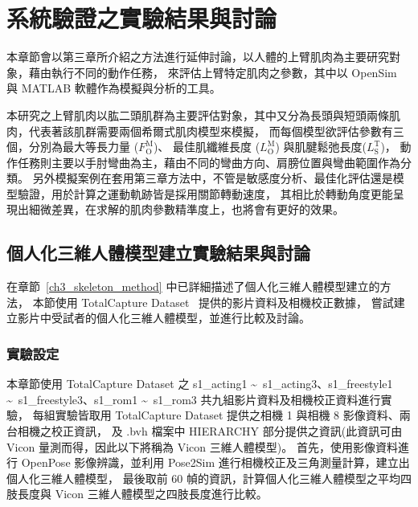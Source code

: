 \chapter{系統驗證之實驗結果與討論}
\fontsize{12pt}{18pt}\selectfont %

本章節會以第三章所介紹之方法進行延伸討論，以人體的上臂肌肉為主要研究對象，藉由執行不同的動作任務，
來評估上臂特定肌肉之參數，其中以 OpenSim 與 MATLAB 軟體作為模擬與分析的工具。

本研究之上臂肌肉以肱二頭肌群為主要評估對象，其中又分為長頭與短頭兩條肌肉，代表著該肌群需要兩個希爾式肌肉模型來模擬，
而每個模型欲評估參數有三個，分別為最大等長力量 ($F^\mathrm{M}_\mathrm{O}$)、
最佳肌纖維長度 ($L^\mathrm{M}_\mathrm{O}$) 與肌腱鬆弛長度($L^\mathrm{T}_\mathrm{S}$)，
動作任務則主要以手肘彎曲為主，藉由不同的彎曲方向、肩膀位置與彎曲範圍作為分類。
另外模擬案例在套用第三章方法中，不管是敏感度分析、最佳化評估還是模型驗證，用於計算之運動軌跡皆是採用關節轉動速度，
其相比於轉動角度更能呈現出細微差異，在求解的肌肉參數精準度上，也將會有更好的效果。

\section{個人化三維人體模型建立實驗結果與討論}\label{ch4_skeleton_exp}
在章節~\ref{ch3_skeleton_method} 中已詳細描述了個人化三維人體模型建立的方法，
本節使用 TotalCapture Dataset~\cite{Trumble:BMVC:2017} 提供的影片資料及相機校正數據，
嘗試建立影片中受試者的個人化三維人體模型，並進行比較及討論。

\subsection{實驗設定}
本章節使用 TotalCapture Dataset 之 
s1\_acting1 \textasciitilde\ s1\_acting3、s1\_freestyle1 \textasciitilde\ s1\_freestyle3、s1\_rom1 \textasciitilde\ s1\_rom3 
共九組影片資料及相機校正資料進行實驗，
每組實驗皆取用 TotalCapture Dataset 提供之相機 1 與相機 8 影像資料、兩台相機之校正資訊，
及 .bvh 檔案中 HIERARCHY 部分提供之資訊(此資訊可由 Vicon 量測而得，因此以下將稱為 Vicon 三維人體模型)。
首先，使用影像資料進行 OpenPose 影像辨識，並利用 Pose2Sim 進行相機校正及三角測量計算，建立出個人化三維人體模型，
最後取前 60 幀的資訊，計算個人化三維人體模型之平均四肢長度與 Vicon 三維人體模型之四肢長度進行比較。

